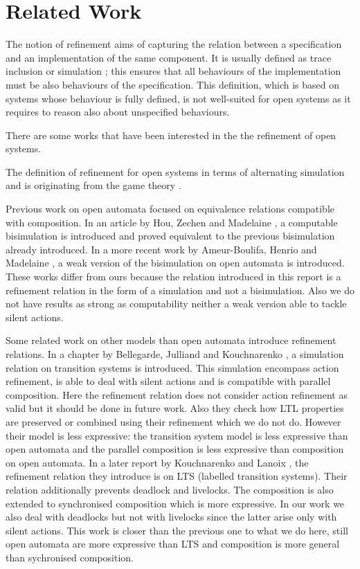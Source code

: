 \documentclass[runningheads]{llncs}
\begin{document}
\section{Related Work}
\label{sec:sota}



The notion of refinement aims of capturing the relation between  a specification and an implementation of the same component. It is usually defined as trace inclusion or simulation \cite{Milner:1980}; this ensures that all behaviours of the implementation must be also behaviours of the specification. This definition, which is based on systems whose behaviour is fully defined, is not well-suited for open systems  as it requires to reason also about unspecified behaviours.

There are some works that have been interested in the  the refinement of open systems. 

The definition of refinement for open systems in terms of alternating simulation \cite{Alur:1998} and \cite{deAlfaro:2021} is originating  from the game theory \cite{deAlfaro:2003}.

Previous work on open automata focused on equivalence relations compatible with composition.
In an article by Hou, Zechen and Madelaine \cite{10.1145/3372884.3373161}, a computable bisimulation is introduced and proved equivalent to the previous bisimulation already introduced.
In a more recent work by Ameur-Boulifa, Henrio and Madelaine \cite{2007.10770}, a weak version of the bisimulation on open automata is introduced.
These works differ from ours because the relation introduced in this report is a refinement relation in the form of a simulation and not a bisimulation.
Also we do not have results as strong as computability neither a weak version able to tackle silent actions.

Some related work on other models than open automata introduce refinement relations.
In a chapter by Bellegarde, Julliand and Kouchnarenko \cite{10.1007/3-540-46428-X_19}, a simulation relation on transition systems is introduced.
This simulation encompass action refinement, is able to deal with silent actions and is compatible with parallel composition.
Here the refinement relation does not consider action refinement as valid but it should be done in future work.
Also they check how LTL properties are preserved or combined using their refinement which we do not do.
However their model is less expressive: the transition system model is less expressive than open automata and the parallel composition is less expressive than composition on open automata.
In a later report by Kouchnarenko and Lanoix \cite{10.1007/978-3-540-70881-0_26}, the refinement relation they introduce is on LTS (labelled transition systems).
Their relation additionally prevents deadlock and livelocks.
The composition is also extended to synchronised composition which is more expressive.
In our work we also deal with deadlocks but not with livelocks since the latter arise only with silent actions.
This work is closer than the previous one to what we do here, still open automata are more expressive than LTS and composition is more general than sychronised composition.
\end{document}
